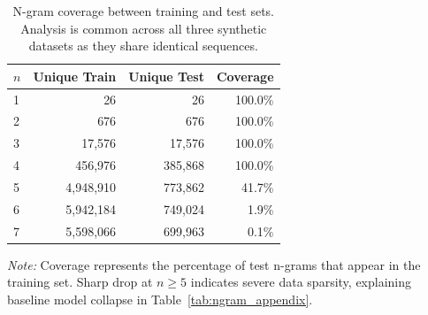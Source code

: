 \documentclass{article}
\theoremstyle{plain}
\theoremstyle{definition}
\theoremstyle{remark}
\begin{document}
\begin{table}[h]
\centering
\caption{N-gram coverage between training and test sets. Analysis is common across all three synthetic datasets as they share identical sequences.}
\label{tab:ngram_coverage}
\small
\begin{tabular}{lrrr}
\toprule
$n$ & Unique Train & Unique Test & Coverage \\
\midrule
1 & 26 & 26 & 100.0\%\\
2 & 676 & 676 & 100.0\% \\
3 & 17,576 & 17,576 & 100.0\% \\
4 & 456,976 & 385,868 & 100.0\%  \\
5 & 4,948,910 & 773,862 & 41.7\% \\
6 & 5,942,184 & 749,024 & 1.9\%  \\
7 & 5,598,066 & 699,963 & 0.1\%  \\
\bottomrule
\end{tabular}
\vspace{0.1cm}

\footnotesize
\textit{Note:} Coverage represents the percentage of test n-grams that appear in the training set. Sharp drop at $n \geq 5$ indicates severe data sparsity, explaining baseline model collapse in Table~\ref{tab:ngram_appendix}.
\end{table}
\end{document}
